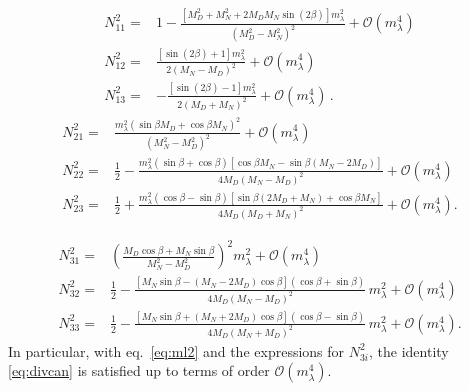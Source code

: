 \begin{align}
N_{11}^2=& 1-\frac{\left[M_D^2+M_N^2+2M_DM_N\sin(2\beta)\right]m^2_{\lambda}}{(M_D^2-M_N^2)^2}+\mathcal{O}\left( m_{\lambda}^4 \right)\nonumber\\
N_{12}^2 =&   \frac{[\sin (2 \beta )+1] m_{\lambda }^2}{2 \left(M_N-M_D\right)^2}+\mathcal{O}\left( m_{\lambda}^4 \right)\nonumber\\
N_{13}^2=&  -\frac{[\sin (2 \beta )-1] m_{\lambda }^2}{2 \left(M_D+M_N\right)^2}+\mathcal{O}\left( m_{\lambda}^4 \right)\,.
\end{align}
\begin{align}
N_{21}^2=&\frac{m_{\lambda }^2 \left(\sin\beta  M_D+\cos\beta
   M_N\right)^2}{\left(M_N^2-M_D^2\right)^2}+\mathcal{O}\left( m_{\lambda}^4 \right)\nonumber\\
N_{22}^2=&\frac{1}{2}-\frac{m_{\lambda }^2 (\sin\beta+\cos\beta) \left[\cos\beta M_N-\sin\beta  \left(M_N-2 M_D\right)\right]}{4 M_D \left(M_N-M_D\right)^2}+\mathcal{O}\left( m_{\lambda}^4 \right)\nonumber\\
   N_{23}^2=&\frac{1}{2}+\frac{m_{\lambda }^2 (\cos\beta-\sin\beta) \left[\sin\beta \left(2
   M_D+M_N\right)+\cos\beta M_N\right]}{4 M_D \left(M_D+M_N\right)^2}+\mathcal{O}\left( m_{\lambda}^4 \right).
\end{align}

\begin{align}
\label{eq:mixl2}
N_{31}^2=&\left(\frac{M_{D} \cos\beta + M_{N} \sin\beta}{M_{N}^{2}- M_{D}^{2}} \right)^{2}   m_{\lambda}^{2}
+\mathcal{O}\left( m_{\lambda}^4 \right)\nonumber\\
N_{32}^2=&\frac{1}{2}-\frac{\left[M_{N} \sin\beta - \left( M_{N}- 2 M_{D}\right) \cos\beta\right] \left(\cos\beta+\sin\beta \right)}{4 M_{D} \left(M_{N}- M_{D}\right)^{2}}\,m_{\lambda}^{2}+\mathcal{O}\left( m_{\lambda}^4 \right)  \nonumber\\
N_{33}^2=&\frac{1}{2}- \frac{\left[M_{N} \sin\beta + \left(M_{N} + 2 M_{D}\right) \cos\beta\right] \left(\cos\beta- \sin\beta \right)}{4 M_{D} \left(M_{N} + M_{D} \right)^{2}} \,m_{\lambda}^{2}+\mathcal{O}\left( m_{\lambda}^4 \right).
\end{align}
In particular, with eq.~\eqref{eq:ml2} and the expressions for $N_{3i}^2$, the identity \eqref{eq:divcan}
is satisfied up to terms of order $\mathcal{O}\left( m_{\lambda}^4
\right)$.






